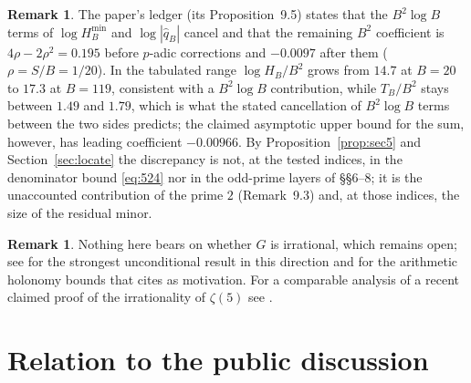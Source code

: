 \documentclass[11pt]{amsart}
\theoremstyle{definition}
\newtheorem{remark}[theorem]{Remark}
\newcommand{\qhat}{\widehat{q}}
\begin{document}
\begin{remark}
The paper's ledger (its Proposition~9.5) states that the $B^2\log B$ terms of $\log H_B^{\min}$ and
$\log|\qhat_B|$ cancel and that the remaining $B^2$ coefficient is $4\rho-2\rho^2=0.195$ before $p$-adic
corrections and $-0.0097$ after them ($\rho=S/B=1/20$). In the tabulated range $\log H_B/B^2$ grows from $14.7$ at $B=20$ to $17.3$ at $B=119$, consistent with a $B^2\log B$ contribution, while $T_B/B^2$ stays between $1.49$ and $1.79$, which is what the stated cancellation of $B^2\log B$ terms between the two sides predicts; the claimed asymptotic upper bound for the sum, however, has leading coefficient $-0.00966$. By Proposition~\ref{prop:sec5} and Section~\ref{sec:locate} the discrepancy is not, at the tested indices, in the denominator bound \eqref{eq:524} nor in the odd-prime layers of \S\S6--8; it is the unaccounted contribution of the prime $2$ (Remark~9.3) and, at those indices, the size of the residual minor.
\end{remark}

\begin{remark}
Nothing here bears on whether $G$ is irrational, which remains open; see \cite{RZ03} for the strongest
unconditional result in this direction and \cite{CDT24} for the arithmetic holonomy bounds that
\cite{Sun26} cites as motivation. For a comparable analysis of a recent claimed proof of the irrationality of
$\zeta(5)$ see \cite{Chen24}.
\end{remark}

\section{Relation to the public discussion}\label{sec:public}
\end{document}
